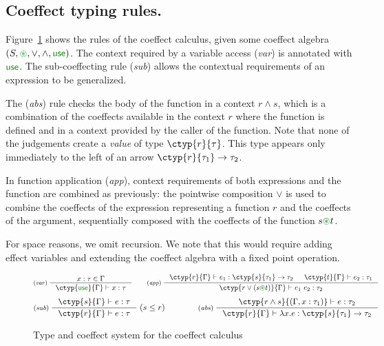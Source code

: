 \vspace{-1em}
\subsection{Coeffect typing rules.}
Figure~\ref{fig:coeffect-typing} shows the
rules of the coeffect calculus, given some coeffect algebra $(S, \cseq, \vee, \wedge, \cunit)$.
The context required by a variable access (\emph{var}) is annotated with $\cunit$.
The sub-coeffecting rule (\emph{sub}) allows the contextual requirements of an expression 
to be generalized.

The (\emph{abs}) rule checks the body of the function in a context $r \wedge s$, which is a 
combination of the coeffects available in the context $r$ where the function is 
defined and in a context provided by the caller of the function. 
Note that none of the judgements create a \emph{value} of type $\ctyp{r}{\tau}$. This
type appears only immediately to the left of  an arrow $\ctyp{r}{\tau_1} \rightarrow \tau_2$.

In function application (\emph{app}), context requirements of both expressions and the 
function are combined as previously: the pointwise composition $\vee$ is used to combine
the coeffects of the expression representing a function $r$ and the coeffects of
the argument, sequentially composed with the coeffects of the function $s \cseq t$.

For space reasons, we omit recursion. We note that this would require adding
effect variables and extending the coeffect algebra with a fixed point operation.


\begin{figure}[t]
\vspace{-1em}
\begin{equation*}
\inference[(\emph{var})\;]
  {x : \tau \in \Gamma}
  {\ctyp{\cunit}{\Gamma} \vdash x : \tau }
%
\quad\quad
%
\inference[(\emph{app})\;]
  {\ctyp{r}{\Gamma} \vdash e_1 : \ctyp{s}{\tau_1} \rightarrow \tau_2 &
   \ctyp{t}{\Gamma} \vdash e_2 : \tau_1 }
  {\ctyp{r \vee (s \cseq t)}{\Gamma} \vdash e_1~e_2 : \tau_2}
\end{equation*}
\begin{equation*}
\inference[(\emph{sub})\;]
  {\ctyp{s}{\Gamma} \vdash e : \tau }
  {\ctyp{r}{\Gamma} \vdash e : \tau }
\;(s\leq r)  
%
\quad\quad\quad\quad
%
\inference[(\emph{abs})\;]
  {\ctyp{r \wedge s}{(\Gamma, x:\tau_1)} \vdash e : \tau_2}
  {\ctyp{r}{\Gamma} \vdash \lambda x.e : \ctyp{s}{\tau_1} \rightarrow \tau_2 }
\end{equation*}
\caption{Type and coeffect system for the coeffect calculus}
\label{fig:coeffect-typing}
\vspace{-1em}
\end{figure}

